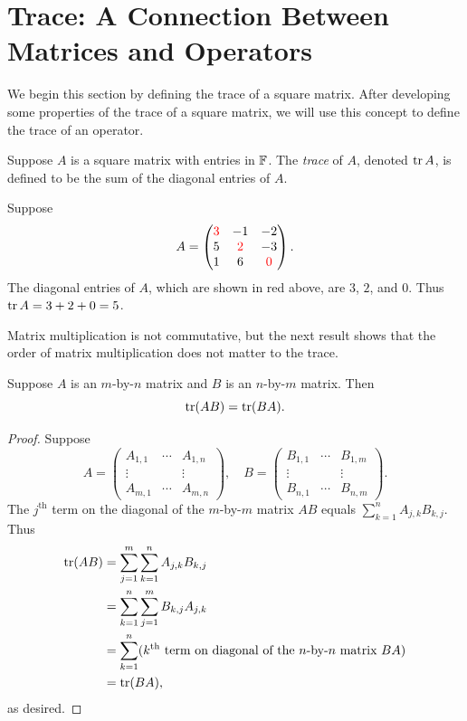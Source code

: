 \section{Trace: A Connection Between Matrices and Operators}

We begin this section by defining the trace of a square matrix. After
developing some properties of the trace of a square matrix, we will use this
concept to define the trace of an operator.

\begin{definition}\label{ax:8.47}
Suppose $A$ is a square matrix with entries in $\mathbb{F}$. The \emph{trace} of $A$,
denoted $\operatorname{tr} A$, is defined to be the sum of the diagonal entries of $A$.
\end{definition}

\begin{example}\label{ax:8.48}
Suppose
\[ A = \begin{pmatrix}
{\color{red}3} & -1 & -2\\
5 & {\color{red}2} & -3\\
1 & 6 & {\color{red}0}
\end{pmatrix}. \]
The diagonal entries of $A$, which are shown in red above, are $3$, $2$, and
$0$. Thus $\operatorname{tr} A=3+2+0=5$.
\end{example}

Matrix multiplication is not commutative, but the next result shows that the
order of matrix multiplication does not matter to the trace.

\begin{result}\label{ax:8.49}
Suppose $A$ is an $m$-by-$n$ matrix and $B$ is an $n$-by-$m$ matrix. Then
\[ \operatorname{tr}(AB) = \operatorname{tr}(BA). \]
\end{result}

\begin{proof}
Suppose
\[ A = \begin{pmatrix}
A_{1,1} & \cdots & A_{1,n}\\
\vdots & & \vdots\\
A_{m,1} & \cdots & A_{m,n}
\end{pmatrix}, \quad
B = \begin{pmatrix}
B_{1,1} & \cdots & B_{1,m}\\
\vdots & & \vdots\\
B_{n,1} & \cdots & B_{n,m}
\end{pmatrix}. \]
The $j^{\text{th}}$ term on the diagonal of the $m$-by-$m$ matrix $AB$ equals
$\sum_{k=1}^n A_{j,k}B_{k,j}$. Thus
\begin{align*}
\operatorname{tr}(AB) &= \sum_{j=1}^m \sum_{k=1}^n A_{j,k}B_{k,j}\\
&= \sum_{k=1}^n \sum_{j=1}^m B_{k,j}A_{j,k}\\
&= \sum_{k=1}^n (k^{\text{th}} \text{ term on diagonal of the
  $n$-by-$n$ matrix } BA)\\
&= \operatorname{tr}(BA),
\end{align*}
as desired.
\end{proof}

